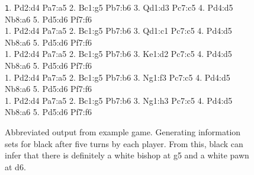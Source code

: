 \documentclass[11pt]{article}
\newenvironment{mytinylisting}
{\begin{list}{}{\setlength{\leftmargin}{1em}}\item\scriptsize\texttt}
{\end{list}}
\begin{document}
\begin{figure}
\begin{mytinylisting}
1. Pd2:d4 Pa7:a5 2. Bc1:g5 Pb7:b6 3. Qd1:d3 Pc7:c5 4. Pd4:d5 Nb8:a6 5. Pd5:d6 Pf7:f6 \\
1. Pd2:d4 Pa7:a5 2. Bc1:g5 Pb7:b6 3. Qd1:c1 Pc7:c5 4. Pd4:d5 Nb8:a6 5. Pd5:d6 Pf7:f6 \\
1. Pd2:d4 Pa7:a5 2. Bc1:g5 Pb7:b6 3. Ke1:d2 Pc7:c5 4. Pd4:d5 Nb8:a6 5. Pd5:d6 Pf7:f6 \\
1. Pd2:d4 Pa7:a5 2. Bc1:g5 Pb7:b6 3. Ng1:f3 Pc7:c5 4. Pd4:d5 Nb8:a6 5. Pd5:d6 Pf7:f6 \\
1. Pd2:d4 Pa7:a5 2. Bc1:g5 Pb7:b6 3. Ng1:h3 Pc7:c5 4. Pd4:d5 Nb8:a6 5. Pd5:d6 Pf7:f6 \\
\end{mytinylisting}
\caption{Abbreviated output from example game.  Generating information sets for black after five turns by each player.
From this, black can infer that there is definitely a white bishop at g5 and a white pawn at d6.}
\label{abbrevoutput}
\end{figure}
\end{document}
